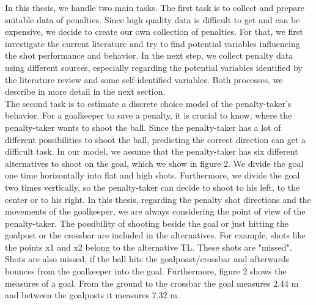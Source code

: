 \documentclass[12pt,dvipsnames]{article}%
\begin{document}



\vspace{-0.5cm}

In this thesis, we handle two main tasks. The first task is to collect and prepare suitable data of penalties. Since high quality data is difficult to get and can be expensive, we decide to create our own collection of penalties. For that, we first investigate the current literature and try to find potential variables influencing the shot performance and behavior. In the next step, we collect penalty data using different sources, especially regarding the potential variables identified by the literature review and some self-identified variables. Both processes, we describe in more detail in the next section. \\
%
%
The second task is to estimate a discrete choice model of the penalty-taker's behavior. For a goalkeeper to save a penalty, it is crucial to know, where the penalty-taker wants to shoot the ball. Since the penalty-taker has a lot of different possibilities to shoot the ball, predicting the correct direction can get a difficult task. In our model, we assume that the penalty-taker has six different alternatives to shoot on the goal, which we show in figure 2. We divide the goal one time horizontally into flat and high shots. Furthermore, we divide the goal two times vertically, so the penalty-taker can decide to shoot to his left, to the center or to his right. In this thesis, regarding the penalty shot directions and the movements of the goalkeeper, we are always considering the point of view of the penalty-taker. The possibility of shooting beside the goal or just hitting the goalpost or the crossbar are included in the alternatives. For example, shots like the points x1 and x2 belong to the alternative TL. These shots are "missed". Shots are also missed, if the ball hits the goalpoast/crossbar and afterwards bounces from the goalkeeper into the goal. Furthermore, figure 2 shows the measures of a goal. From the ground to the crossbar the goal measures 2.44 m and between the goalposts it measures 7.32 m.
\end{document}
